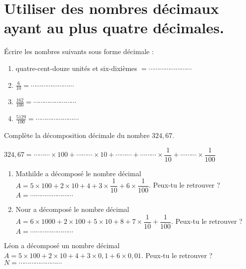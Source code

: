\section{Utiliser des nombres décimaux ayant au plus quatre décimales.}

\begin{minipage}{0.5\linewidth}


Écrire les nombres suivants sous forme décimale :
\begin{enumerate}
\item quatre-cent-douze unités et six-dixièmes $= \cdots\cdots\cdots\cdots\cdots\cdots\cdots\cdots $
\item $\frac{6}{10}= \cdots\cdots\cdots\cdots\cdots\cdots\cdots\cdots$
\item $\frac{162}{100}= \cdots\cdots\cdots\cdots\cdots\cdots\cdots\cdots$
\item $\frac{5129}{100}= \cdots\cdots\cdots\cdots\cdots\cdots\cdots\cdots$
\end{enumerate}
 

Complète la décomposition décimale du nombre $324,67$.

$324,67 = \cdots\cdots\cdots  \times 100 + \cdots\cdots\cdots \times 10 + \cdots\cdots\cdots  + \cdots\cdots\cdots \times \dfrac{1}{10} + \cdots\cdots\cdots \times \dfrac{1}{100} $




\begin{enumerate}


\item Mathilde a décomposé le nombre décimal  $A = 5\times 100 + 2\times 10 + 4 + 3\times \dfrac{1}{10} +  6\times \dfrac{1}{100} $. Peux-tu le retrouver ?
$A = \cdots\cdots\cdots\cdots\cdots\cdots\cdots\cdots $

\item Nour a décomposé le nombre décimal  $A = 6\times 1000 + 2\times 100 + 5\times 10 + 8 + 7\times \dfrac{1}{10} +   \dfrac{1}{100} $. Peux-tu le retrouver ?
$A = \cdots\cdots\cdots\cdots\cdots\cdots\cdots\cdots $
\end{enumerate}



Léon a décomposé un nombre décimal  $A = 5\times 100 + 2\times 10 + 4 + 3\times 0,1 +  6\times 0,01 $. Peux-tu le retrouver ?
$N = \cdots\cdots\cdots\cdots\cdots\cdots\cdots\cdots $



\end{minipage}
